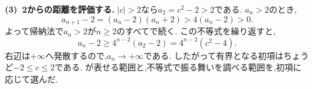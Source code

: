 \begin{enumerate}[label=\textbf{問\arabic*.},leftmargin=3.8em,format=\bookitemlink{practice-special}{solution}{problem}]
    \smallskip
    \textbf{(3)~2からの距離を評価する.}
    $|c|>2$なら$a_2=c^2-2>2$である.
    $a_n>2$のとき,
    \[
      a_{n+1}-2=(a_n-2)(a_n+2)>4(a_n-2)>0.
    \]
    よって帰納法で$a_n>2$が$n\ge2$のすべてで続く.
    この不等式を繰り返すと,
    \[
      a_n-2\ge4^{n-2}(a_2-2)
      =4^{n-2}(c^2-4).
    \]
    右辺は$+\infty$へ発散するので,$a_n\to+\infty$である.
    したがって有界となる初項はちょうど$-2\le c\le2$である.
    が表せる範囲と,不等式で振る舞いを調べる範囲を,初項に応じて選んだ.
\end{enumerate}
